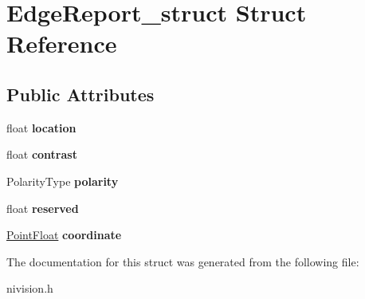 \hypertarget{structEdgeReport__struct}{\section{\-Edge\-Report\-\_\-struct \-Struct \-Reference}
\label{structEdgeReport__struct}
}
\subsection*{\-Public \-Attributes}
\begin{DoxyCompactItemize}
\item 
\hypertarget{structEdgeReport__struct_a5b52258eeec6af14a1f53caeb79f009d}{float {\bfseries location}}\label{structEdgeReport__struct_a5b52258eeec6af14a1f53caeb79f009d}

\item 
\hypertarget{structEdgeReport__struct_a571a11c51709d09a0a10c55cc5240ff4}{float {\bfseries contrast}}\label{structEdgeReport__struct_a571a11c51709d09a0a10c55cc5240ff4}

\item 
\hypertarget{structEdgeReport__struct_a561439f8fc889388f32d148d97cdbffa}{\-Polarity\-Type {\bfseries polarity}}\label{structEdgeReport__struct_a561439f8fc889388f32d148d97cdbffa}

\item 
\hypertarget{structEdgeReport__struct_a9221def94e693eac4cbfd4c76ace93b8}{float {\bfseries reserved}}\label{structEdgeReport__struct_a9221def94e693eac4cbfd4c76ace93b8}

\item 
\hypertarget{structEdgeReport__struct_a4661a2cc3dbad7b73a0f4d8927e4757a}{\hyperlink{structPointFloat__struct}{\-Point\-Float} {\bfseries coordinate}}\label{structEdgeReport__struct_a4661a2cc3dbad7b73a0f4d8927e4757a}

\end{DoxyCompactItemize}


\-The documentation for this struct was generated from the following file\-:\begin{DoxyCompactItemize}
\item 
nivision.\-h\end{DoxyCompactItemize}
